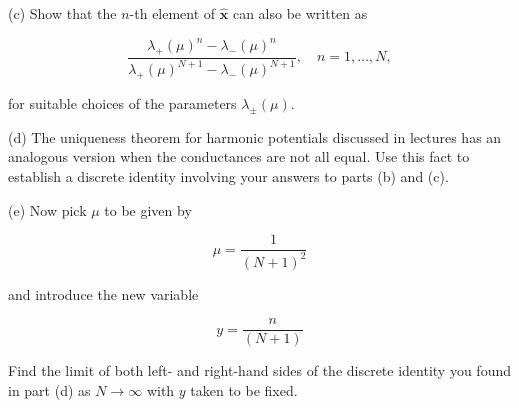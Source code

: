 \documentclass[10pt, a4paper]{article}
\begin{document}
\begin{Problem}
(c) Show that the $n$-th element of $\hat{\mathbf{x}}$ can also be written as

$$
\frac{\lambda_{+}(\mu)^{n}-\lambda_{-}(\mu)^{n}}{\lambda_{+}(\mu)^{N+1}-\lambda_{-}(\mu)^{N+1}}, \quad n=1, \ldots, N,
$$

for suitable choices of the parameters $\lambda_{ \pm}(\mu)$.

(d) The uniqueness theorem for harmonic potentials discussed in lectures has an analogous version when the conductances are not all equal. Use this fact to establish a discrete identity involving your answers to parts (b) and (c).

(e) Now pick $\mu$ to be given by

$$
\mu=\frac{1}{(N+1)^{2}}
$$

and introduce the new variable

$$
y=\frac{n}{(N+1)}
$$

Find the limit of both left- and right-hand sides of the discrete identity you found in part (d) as $N \rightarrow \infty$ with $y$ taken to be fixed.
\end{Problem}
\end{document}
